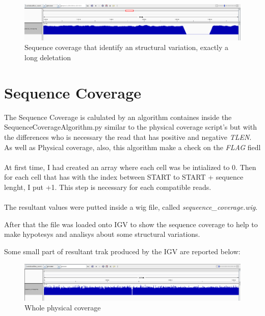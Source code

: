 				
				
 \begin{figure}[H]
				\centering
				\includegraphics[scale=0.6]{immagini/physical_coverage_3.png}
				\caption{Sequence coverage that identify an structural variation, exactly a long deletation}\label{fig:8}
				\end{figure}				


\section{Sequence Coverage}
The Sequence Coverage is calulated by an algorithm containes inside the SequenceCoverageAlgorithm.py similar to the physical coverage script's but with the differences who is necessary the read that has positive and negative \emph{TLEN}.\\
As well as Physical coverage, also, this algorithm make a check on the \emph{FLAG} fiedl
\\
\\

At first time, I had created an array where each cell was be intialized to 0.
Then for each cell that has with the index between START to START + sequence lenght, I put +1.
This step is necessary for each compatible reads.\\\\

The resultant values were putted inside a wig file, called \emph{sequeence\_coverage.wig}.

After that the file was loaded onto IGV to show the sequence coverage to help to make hypotesys and analisys about some structural variations.

Some small part of resultant trak produced by the IGV are reported below:


 \begin{figure}[H]
				\centering
				\includegraphics[scale=0.6]{immagini/sequence_coverage_1.png}
				\caption{Whole physical coverage}\label{fig:9}
				\end{figure}


